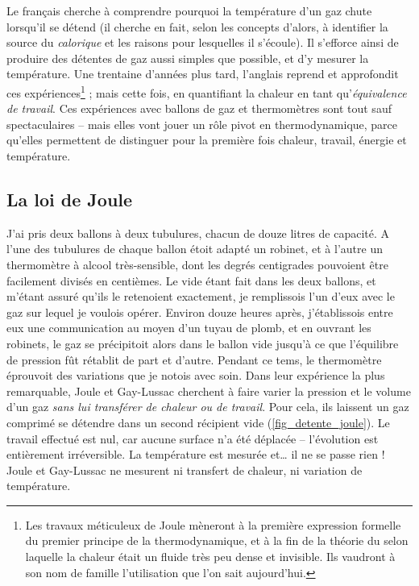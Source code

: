 		Le français  cherche à comprendre pourquoi la température d’un gaz chute lorsqu’il se détend (il cherche en fait, selon les concepts d’alors, à identifier la source du \textit{calorique} et les raisons pour lesquelles il s’écoule). Il s’efforce ainsi de produire des détentes de gaz aussi simples que possible, et d’y mesurer la température. Une trentaine d’années plus tard, l’anglais  reprend et approfondit ces expériences\footnote{Les travaux méticuleux de Joule mèneront à la première expression formelle du premier principe de la thermodynamique, et à la fin de la théorie du  selon laquelle la chaleur était un fluide très peu dense et invisible. Ils vaudront à son nom de famille l’utilisation que l’on sait aujourd’hui.} ; mais cette fois, en quantifiant la chaleur en tant qu’\textit{équivalence de travail}. Ces expériences avec ballons de gaz et thermomètres sont tout sauf spectaculaires -- mais elles vont jouer un rôle pivot en thermodynamique, parce qu’elles permettent de distinguer pour la première fois chaleur, travail, énergie et température.

	\subsection{La loi de Joule}
	\label{ch_principe_de_joule}

			J’ai pris deux ballons à deux tubulures, chacun de douze litres de capacité. A l’une des tubulures de chaque ballon étoit adapté un robinet, et à l’autre un thermomètre à alcool très-sensible, dont les degrés centigrades pouvoient être facilement divisés en centièmes. \jecourte Le vide étant fait dans les deux ballons, et m’étant assuré qu’ils le retenoient exactement, je remplissois l’un d’eux avec le gaz sur lequel je voulois opérer. Environ douze heures après, j’établissois entre eux une communication au moyen d’un tuyau de plomb, et en ouvrant les robinets, le gaz se précipitoit alors dans le ballon vide jusqu’à ce que l’équilibre de pression fût rétablit de part et d’autre. Pendant ce tems, le thermomètre éprouvoit des variations que je notois avec soin.
		Dans leur expérience la plus remarquable, Joule et Gay-Lussac cherchent à faire varier la pression et le volume d’un gaz \emph{sans lui transférer de chaleur ou de travail}. Pour cela, ils laissent un gaz comprimé se détendre dans un second récipient vide (\cref{fig_detente_joule}). Le travail effectué est nul, car aucune surface n’a été déplacée – l’évolution est entièrement irréversible. La température est mesurée et… il ne se passe rien ! Joule et Gay-Lussac ne mesurent ni transfert de chaleur, ni variation de température.

